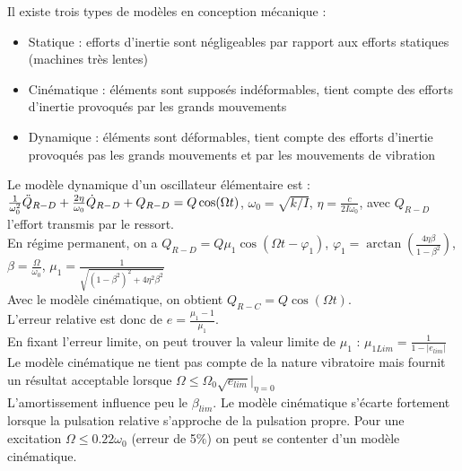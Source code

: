\documentclass[../main.tex]{subfiles}
\begin{document}
Il existe trois types de modèles en conception mécanique : \begin{itemize}
    \item Statique : efforts d'inertie sont négligeables par rapport aux efforts statiques (machines très lentes)\\
    \item Cinématique : éléments sont supposés indéformables, tient compte des efforts d'inertie provoqués par les grands mouvements\\
    \item Dynamique : éléments sont déformables, tient compte des efforts d'inertie provoqués pas les grands mouvements et par les mouvements de vibration\\
\end{itemize}

Le modèle dynamique d'un oscillateur élémentaire est : $\frac{1}{\omega_0^2} \Ddot{Q}_{R-D} + \frac{2\eta}{\omega_0} \dot{Q}_{R-D} + Q_{R-D} = Q \cos(\Omega t)$, $\omega_0 = \sqrt{k/I}$, $\eta = \frac{c}{2I\omega_0}$, avec $Q_{R-D} $ l'effort transmis par le ressort.\\

En régime permanent, on a $Q_{R-D} = Q \mu_1 \cos(\Omega t - \varphi_1)$, $\varphi_1 = \arctan(\frac{4\eta \beta}{1-\beta^2})$, $\beta = \frac{\Omega}{\omega_0}$, $\mu_1 = \frac{1}{\sqrt{(1-\beta^2)^2 + 4 \eta^2 \beta^2}}$\\

Avec le modèle cinématique, on obtient $Q_{R-C} = Q\cos(\Omega t)$.\\

L'erreur relative est donc de $e = \frac{\mu_1-1}{\mu_1}$.\\

En fixant l'erreur limite, on peut trouver la valeur limite de $\mu_1$ : $\mu_{1Lim} = \frac{1}{1-\lvert e_{lim}\rvert}$\\

Le modèle cinématique ne tient pas compte de la nature vibratoire mais fournit un résultat acceptable lorsque $\Omega \leq \Omega_0 \sqrt{e_{lim}}\lvert_{\eta=0}$\\

L'amortissement influence peu le $\beta_{lim}$. Le modèle cinématique s'écarte fortement lorsque la pulsation relative s'approche de la pulsation propre. Pour une excitation $\Omega \leq 0.22\omega_0$ (erreur de 5$\%$) on peut se contenter d'un modèle cinématique.\\
\end{document}

